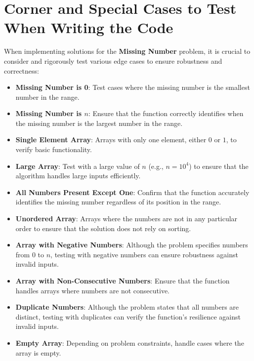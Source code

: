 \section*{Corner and Special Cases to Test When Writing the Code}

When implementing solutions for the \textbf{Missing Number} problem, it is crucial to consider and rigorously test various edge cases to ensure robustness and correctness:

\begin{itemize}
    \item \textbf{Missing Number is 0}: Test cases where the missing number is the smallest number in the range.
    
    \item \textbf{Missing Number is \(n\)}: Ensure that the function correctly identifies when the missing number is the largest number in the range.
    
    \item \textbf{Single Element Array}: Arrays with only one element, either \(0\) or \(1\), to verify basic functionality.
    
    \item \textbf{Large Array}: Test with a large value of \(n\) (e.g., \(n = 10^4\)) to ensure that the algorithm handles large inputs efficiently.
    
    \item \textbf{All Numbers Present Except One}: Confirm that the function accurately identifies the missing number regardless of its position in the range.
    
    \item \textbf{Unordered Array}: Arrays where the numbers are not in any particular order to ensure that the solution does not rely on sorting.
    
    \item \textbf{Array with Negative Numbers}: Although the problem specifies numbers from \(0\) to \(n\), testing with negative numbers can ensure robustness against invalid inputs.
    
    \item \textbf{Array with Non-Consecutive Numbers}: Ensure that the function handles arrays where numbers are not consecutive.
    
    \item \textbf{Duplicate Numbers}: Although the problem states that all numbers are distinct, testing with duplicates can verify the function's resilience against invalid inputs.
    
    \item \textbf{Empty Array}: Depending on problem constraints, handle cases where the array is empty.
\end{itemize}

